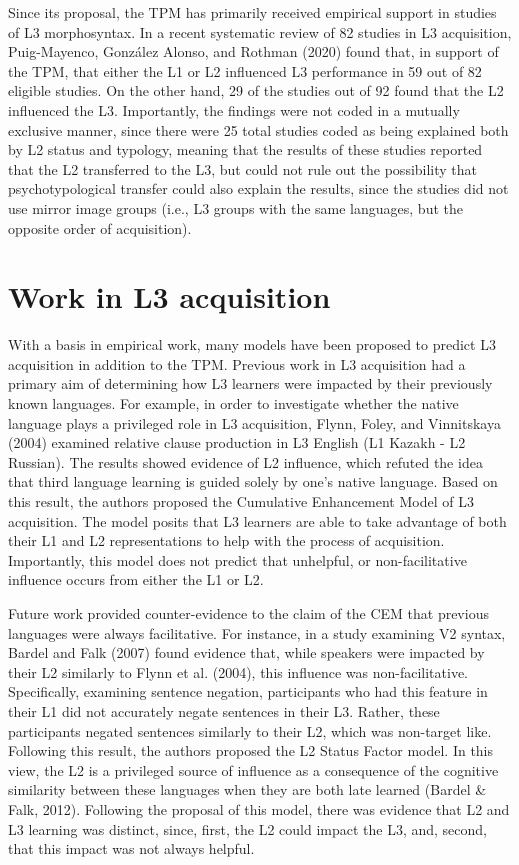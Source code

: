 \documentclass[
  man]{apa6}
\begin{document}
Since its proposal, the TPM has primarily received empirical support in studies of L3 morphosyntax.
In a recent systematic review of 82 studies in L3 acquisition, Puig-Mayenco, González Alonso, and Rothman (2020) found that, in support of the TPM, that either the L1 or L2 influenced L3 performance in 59 out of 82 eligible studies.
On the other hand, 29 of the studies out of 92 found that the L2 influenced the L3.
Importantly, the findings were not coded in a mutually exclusive manner, since there were 25 total studies coded as being explained both by L2 status and typology, meaning that the results of these studies reported that the L2 transferred to the L3, but could not rule out the possibility that psychotypological transfer could also explain the results, since the studies did not use mirror image groups (i.e., L3 groups with the same languages, but the opposite order of acquisition).

\hypertarget{work-in-l3-acquisition}{%
\section{Work in L3 acquisition}\label{work-in-l3-acquisition}}

With a basis in empirical work, many models have been proposed to predict L3 acquisition in addition to the TPM.
Previous work in L3 acquisition had a primary aim of determining how L3 learners were impacted by their previously known languages.
For example, in order to investigate whether the native language plays a privileged role in L3 acquisition, Flynn, Foley, and Vinnitskaya (2004) examined relative clause production in L3 English (L1 Kazakh - L2 Russian).
The results showed evidence of L2 influence, which refuted the idea that third language learning is guided solely by one's native language.
Based on this result, the authors proposed the Cumulative Enhancement Model of L3 acquisition.
The model posits that L3 learners are able to take advantage of both their L1 and L2 representations to help with the process of acquisition.
Importantly, this model does not predict that unhelpful, or non-facilitative influence occurs from either the L1 or L2.

Future work provided counter-evidence to the claim of the CEM that previous languages were always facilitative.
For instance, in a study examining V2 syntax, Bardel and Falk (2007) found evidence that, while speakers were impacted by their L2 similarly to Flynn et al. (2004), this influence was non-facilitative.
Specifically, examining sentence negation, participants who had this feature in their L1 did not accurately negate sentences in their L3.
Rather, these participants negated sentences similarly to their L2, which was non-target like.
Following this result, the authors proposed the L2 Status Factor model.
In this view, the L2 is a privileged source of influence as a consequence of the cognitive similarity between these languages when they are both late learned (Bardel \& Falk, 2012).
Following the proposal of this model, there was evidence that L2 and L3 learning was distinct, since, first, the L2 could impact the L3, and, second, that this impact was not always helpful.
\end{document}
